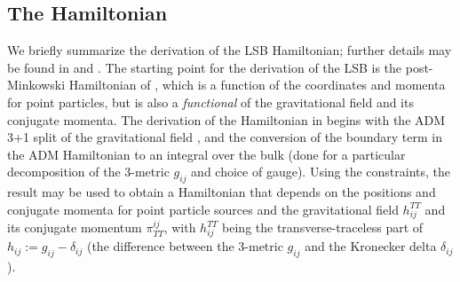 \documentclass[aps,onecolumn,notitlepage,eqsecnum,nofootinbib,floatfix,superscriptaddress]{revtex4-1}
\begin{document}
\subsection{The Hamiltonian}
We briefly summarize the derivation of the LSB Hamiltonian; further details may be found in \cite{PM} and \cite{Schafer1986}. The starting point for the derivation of the LSB is the post-Minkowski Hamiltonian of \cite{Schafer1986}, which is a function of the coordinates and momenta for point particles, but is also a \textit{functional} of the gravitational field and its conjugate momenta. The derivation of the Hamiltonian in \cite{Schafer1986} begins with the ADM 3+1 split of the gravitational field \cite{MTW,ADM62,*ADM62b}, and the conversion of the boundary term in the ADM Hamiltonian to an integral over the bulk (done for a particular decomposition of the 3-metric $g_{ij}$ and choice of gauge). Using the constraints, the result may be used to obtain a Hamiltonian that depends on the positions and conjugate momenta for point particle sources and the gravitational field $h^{TT}_{ij}$ and its conjugate momentum $\pi^{ij}_{TT}$, with $h^{TT}_{ij}$ being the transverse-traceless part of $h_{ij}:=g_{ij}-\delta_{ij}$ (the difference between the 3-metric $g_{ij}$ and the Kronecker delta $\delta_{ij}$). 
\end{document}
